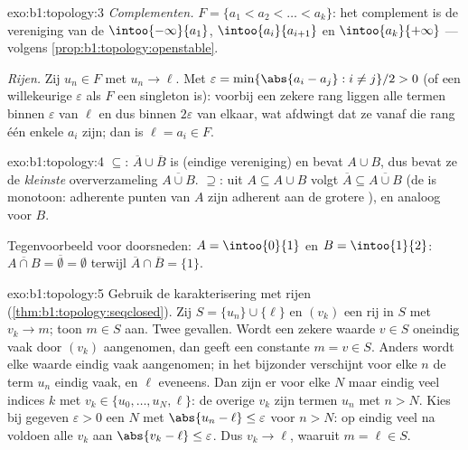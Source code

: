 \begin{solution}{exo:b1:topology:3}
\emph{Complementen.} $F = \{a_1 < a_2 < \dots < a_k\}$: het complement is
de vereniging van de   $\intoo{-\infty}{a_1}$,
$\intoo{a_i}{a_{i+1}}$ en $\intoo{a_k}{+\infty}$ ---  volgens
\cref{prop:b1:topology:openstable}.

\emph{Rijen.} Zij $u_n \in F$ met $u_n \to \ell$. Met $\varepsilon =
\min\{\abs{a_i - a_j} : i \neq j\}/2 > 0$ (of een willekeurige
$\varepsilon$ als $F$ een singleton is): voorbij een zekere rang liggen
alle termen binnen $\varepsilon$ van $\ell$ en dus binnen $2\varepsilon$
van elkaar, wat afdwingt dat ze vanaf die rang één enkele $a_i$ zijn; dan
is $\ell = a_i \in F$.
\end{solution}

\begin{solution}{exo:b1:topology:4}
$\subseteq$: $\overline A \cup \overline B$ is  (eindige
vereniging) en bevat $A \cup B$, dus bevat ze de \emph{kleinste} 
oververzameling $\overline{A \cup B}$. $\supseteq$: uit $A \subseteq A
\cup B$ volgt $\overline A \subseteq \overline{A \cup B}$ (de 
is monotoon: adherente punten van $A$ zijn adherent aan de grotere
), en analoog voor $B$.

Tegenvoorbeeld voor doorsneden: $A = \intoo{0}{1}$ en $B =
\intoo{1}{2}$: $\overline{A \cap B} = \overline\emptyset = \emptyset$
terwijl $\overline A \cap \overline B = \{1\}$.
\end{solution}

\begin{solution}{exo:b1:topology:5}
Gebruik de karakterisering met rijen
(\cref{thm:b1:topology:seqclosed}). Zij $S = \{u_n\} \cup \{\ell\}$ en
$(v_k)$ een rij in $S$ met $v_k \to m$; toon $m \in S$ aan. Twee
gevallen. Wordt een zekere waarde $v \in S$ oneindig vaak door $(v_k)$
aangenomen, dan geeft een constante  $m = v \in S$. Anders wordt
elke waarde eindig vaak aangenomen; in het bijzonder verschijnt voor elke
$n$ de term $u_n$ eindig vaak, en $\ell$ eveneens. Dan zijn er voor elke
$N$ maar eindig veel indices $k$ met $v_k \in \{u_0, \dots, u_N, \ell\}$:
de overige $v_k$ zijn termen $u_n$ met $n > N$. Kies bij gegeven
$\varepsilon > 0$ een $N$ met $\abs{u_n - \ell} \leq \varepsilon$ voor $n
> N$: op eindig veel na voldoen alle $v_k$ aan $\abs{v_k - \ell} \leq
\varepsilon$. Dus $v_k \to \ell$, waaruit $m = \ell \in S$.
\end{solution}


